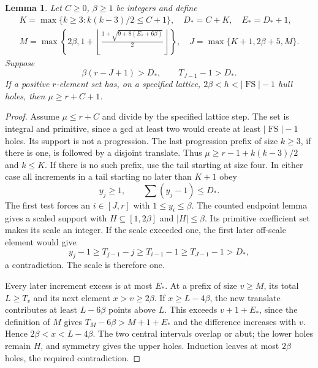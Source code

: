 \documentclass[11pt,a4paper]{article}
\newcommand{\FS}{\operatorname{FS}}
\newtheorem{lemma}[theorem]{Lemma}
\begin{document}
\begin{lemma}\label{lem:effective}
Let $C\ge0$, $\beta\ge1$ be integers and define
\begin{gather*}
 K=\max\{k\ge3:k(k-3)/2\le C+1\},\quad D_*=C+K,\quad E_*=D_*+1,\\
 M=\max\left\{2\beta,1+\left\lfloor
 \frac{1+\sqrt{9+8(E_*+6\beta)}}2\right\rfloor\right\},
 \quad J=\max\{K+1,2\beta+5,M\}.
\end{gather*}
Suppose
\begin{equation}\label{eq:effective-tests}
 \beta(r-J+1)>D_*,\qquad T_{J-1}-1>D_*.
\end{equation}
If a positive $r$-element set has, on a specified lattice,
$2\beta<h<|\FS|-1$ hull holes, then $\mu\ge r+C+1$.
\end{lemma}
\begin{proof}
Assume $\mu\le r+C$ and divide by the specified lattice step. The set
is integral and primitive, since a gcd at least two would create at
least $|\FS|-1$ holes. Its support is not a progression.
The last progression prefix of size $k\ge3$, if there is one, is
followed by a disjoint translate. Thus
$\mu\ge r-1+k(k-3)/2$ and $k\le K$. If there is no such prefix, use
the tail starting at size four. In either case all increments in a tail
starting no later than $K+1$ obey
\[
 y_j\ge1,\qquad \sum(y_j-1)\le D_*.
\]
The first test forces an $i\in[J,r]$ with $1\le y_i\le\beta$.
The counted endpoint lemma gives a scaled support with
$H\subseteq[1,2\beta]$ and $|H|\le\beta$. Its primitive coefficient
set makes its scale an integer. If the scale exceeded one, the first
later off-scale element would give
\[
 y_j-1\ge T_{j-1}-j\ge T_{i-1}-1\ge T_{J-1}-1>D_*,
\]
a contradiction. The scale is therefore one.

Every later increment excess is at most $E_*$. At a prefix of size
$v\ge M$, its total $L\ge T_v$ and its next element $x>v\ge2\beta$.
If $x\ge L-4\beta$, the new translate contributes at least $L-6\beta$
points above $L$. This exceeds $v+1+E_*$, since the definition of $M$
gives $T_M-6\beta>M+1+E_*$ and the difference increases with $v$.
Hence $2\beta<x<L-4\beta$. The two central intervals overlap or abut;
the lower holes remain $H$, and symmetry gives the upper holes.
Induction leaves at most $2\beta$ holes, the required contradiction.
\end{proof}
\end{document}
